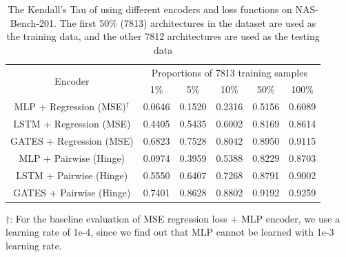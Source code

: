 \addtolength{\tabcolsep}{1pt}
\begin{table}[tb]
  \vspace{-5pt}
\caption{The Kendall’s Tau of using different encoders and loss functions on NAS-Bench-201. The first 50\% (7813) architectures in the dataset are used as the training data, and the other 7812 architectures are used as the testing data}
\label{table:gates-nb201}
\begin{center}

\begin{tabular}{cccccc}
\toprule
\multirow{2}{*}{Encoder} & \multicolumn{5}{c}{Proportions of 7813 training samples}\\ 
\cmidrule(lr){2-6} & 1\% & 5\% & 10\% & 50\% & 100\% \\\midrule
MLP + Regression (MSE)$^\dagger$ & 0.0646 & 0.1520 & 0.2316 & 0.5156 & 0.6089  \\
LSTM + Regression (MSE) & 0.4405 & 0.5435 & 0.6002 & 0.8169 & 0.8614\\
GATES + Regression (MSE) & 0.6823 & 0.7528 & 0.8042 & 0.8950 & 0.9115\\\hline
MLP + Pairwise (Hinge)  &  0.0974 & 0.3959 & 0.5388 & 0.8229 & 0.8703\\
LSTM + Pairwise (Hinge) & 0.5550 & 0.6407 & 0.7268 & 0.8791 & 0.9002\\
  GATES + Pairwise (Hinge) & 0.7401 & 0.8628 & 0.8802 & 0.9192 & 0.9259\\\bottomrule

\end{tabular}
\begin{minipage}{1.0\textwidth}
{\small
$\dagger$: For the baseline evaluation of MSE regression loss + MLP encoder, we use a learning rate of 1e-4, since we find out that MLP cannot be learned with 1e-3 learning rate.%
}
\end{minipage}
\end{center}
\vspace{-5pt}
\end{table}
\addtolength{\tabcolsep}{-1pt}

